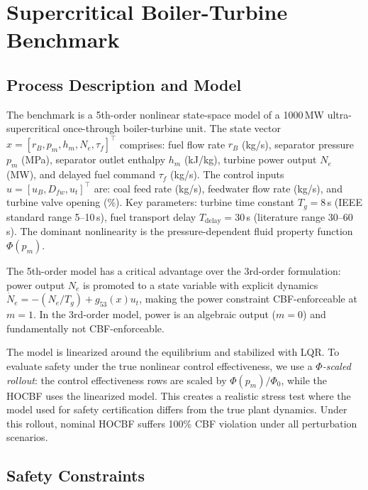 \section{Supercritical Boiler-Turbine Benchmark}
\label{sec:ccs}

\subsection{Process Description and Model}

The benchmark is a 5th-order nonlinear state-space model of a 1000\,MW ultra-supercritical once-through boiler-turbine unit. The state vector $x = [r_B, p_m, h_m, N_e, \tau_f]^\top$ comprises: fuel flow rate $r_B$ (kg/s), separator pressure $p_m$ (MPa), separator outlet enthalpy $h_m$ (kJ/kg), turbine power output $N_e$ (MW), and delayed fuel command $\tau_f$ (kg/s). The control inputs $u = [u_B, D_{fw}, u_t]^\top$ are: coal feed rate (kg/s), feedwater flow rate (kg/s), and turbine valve opening (\%). Key parameters: turbine time constant $T_g = 8$\,s (IEEE standard range 5--10\,s), fuel transport delay $T_{\mathrm{delay}} = 30$\,s (literature range 30--60\,s). The dominant nonlinearity is the pressure-dependent fluid property function $\Phi(p_m)$.

The 5th-order model has a critical advantage over the 3rd-order formulation: power output $N_e$ is promoted to a state variable with explicit dynamics $\dot{N}_e = -(N_e/T_g) + g_{53}(x) u_t$, making the power constraint CBF-enforceable at $m=1$. In the 3rd-order model, power is an algebraic output ($m=0$) and fundamentally not CBF-enforceable.

The model is linearized around the equilibrium and stabilized with LQR. To evaluate safety under the true nonlinear control effectiveness, we use a \emph{$\Phi$-scaled rollout}: the control effectiveness rows are scaled by $\Phi(p_m)/\Phi_0$, while the HOCBF uses the linearized model. This creates a realistic stress test where the model used for safety certification differs from the true plant dynamics. Under this rollout, nominal HOCBF suffers 100\% CBF violation under all perturbation scenarios.

\subsection{Safety Constraints}


